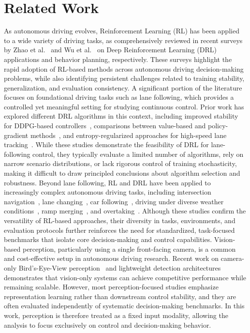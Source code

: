 \documentclass[]{interact}
\begin{document}
\section{Related Work}
As autonomous driving evolves, Reinforcement Learning (RL) has been applied to a wide variety of driving tasks, as comprehensively reviewed in recent surveys by Zhao et al.~\cite{zhao2024survey} and Wu et al.~\cite{wu2024survey} on Deep Reinforcement Learning (DRL) applications and behavior planning, respectively. These surveys highlight the rapid adoption of RL-based methods across autonomous driving decision-making problems, while also identifying persistent challenges related to training stability, generalization, and evaluation consistency.
A significant portion of the literature focuses on foundational driving tasks such as lane following, which provides a controlled yet meaningful setting for studying continuous control. Prior work has explored different DRL algorithms in this context, including improved stability for DDPG-based controllers~\cite{hua2022exploration}, comparisons between value-based and policy-gradient methods~\cite{sabbir2025comparative}, and entropy-regularized approaches for high-speed lane tracking~\cite{liu2024highspeed}. While these studies demonstrate the feasibility of DRL for lane-following control, they typically evaluate a limited number of algorithms, rely on narrow scenario distributions, or lack rigorous control of training stochasticity, making it difficult to draw principled conclusions about algorithm selection and robustness.
Beyond lane following, RL and DRL have been applied to increasingly complex autonomous driving tasks, including intersection navigation~\cite{benelallid2023intersection,shankar2025deep, liu2021rlbenchmark, jayawardana2023,cederle2024distributed,Spatharis02012024}, lane changing~\cite{wang2024benchmarking}, car following~\cite{liu2024comparative,chen2023follownet,Marin04122025}, driving under diverse weather conditions~\cite{tang2020,almalioglu2022,lee2024robust,BenElallid02112025}, ramp merging~\cite{chen2023rampmerging}, and overtaking~\cite{cui2023multiinput, li2020deepRL}. Although these studies confirm the versatility of RL-based approaches, their diversity in tasks, environments, and evaluation protocols further reinforces the need for standardized, task-focused benchmarks that isolate core decision-making and control capabilities.
Vision-based perception, particularly using a single front-facing camera, is a common and cost-effective setup in autonomous driving research. Recent work on camera-only Bird’s-Eye-View perception~\cite{geiger2012kitti,busch2023improved,unger2023multicamera} and lightweight detection architectures~\cite{wu2022yolop,howard2017mobilenets,liu2016ssd} demonstrates that vision-only systems can achieve competitive performance while remaining scalable. However, most perception-focused studies emphasize representation learning rather than downstream control stability, and they are often evaluated independently of systematic decision-making benchmarks. In this work, perception is therefore treated as a fixed input modality, allowing the analysis to focus exclusively on control and decision-making behavior.
\end{document}
